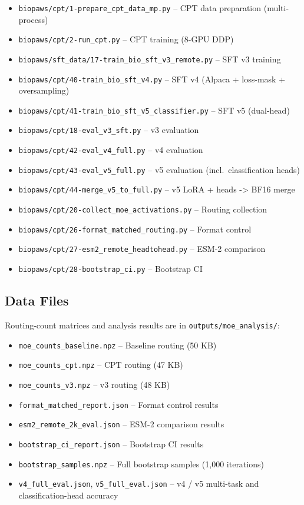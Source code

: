 \documentclass[11pt]{article}
\begin{document}
\begin{itemize}
\item \texttt{biopaws/cpt/1-prepare\_cpt\_data\_mp.py} -- CPT data preparation (multi-process)
\item \texttt{biopaws/cpt/2-run\_cpt.py} -- CPT training (8-GPU DDP)
\item \texttt{biopaws/sft\_data/17-train\_bio\_sft\_v3\_remote.py} -- SFT v3 training
\item \texttt{biopaws/cpt/40-train\_bio\_sft\_v4.py} -- SFT v4 (Alpaca + loss-mask + oversampling)
\item \texttt{biopaws/cpt/41-train\_bio\_sft\_v5\_classifier.py} -- SFT v5 (dual-head)
\item \texttt{biopaws/cpt/18-eval\_v3\_sft.py} -- v3 evaluation
\item \texttt{biopaws/cpt/42-eval\_v4\_full.py} -- v4 evaluation
\item \texttt{biopaws/cpt/43-eval\_v5\_full.py} -- v5 evaluation (incl.\ classification heads)
\item \texttt{biopaws/cpt/44-merge\_v5\_to\_full.py} -- v5 LoRA + heads -> BF16 merge
\item \texttt{biopaws/cpt/20-collect\_moe\_activations.py} -- Routing collection
\item \texttt{biopaws/cpt/26-format\_matched\_routing.py} -- Format control
\item \texttt{biopaws/cpt/27-esm2\_remote\_headtohead.py} -- ESM-2 comparison
\item \texttt{biopaws/cpt/28-bootstrap\_ci.py} -- Bootstrap CI
\end{itemize}

\subsection{Data Files}

Routing-count matrices and analysis results are in \texttt{outputs/moe\_analysis/}:

\begin{itemize}
\item \texttt{moe\_counts\_baseline.npz} -- Baseline routing (50 KB)
\item \texttt{moe\_counts\_cpt.npz} -- CPT routing (47 KB)
\item \texttt{moe\_counts\_v3.npz} -- v3 routing (48 KB)
\item \texttt{format\_matched\_report.json} -- Format control results
\item \texttt{esm2\_remote\_2k\_eval.json} -- ESM-2 comparison results
\item \texttt{bootstrap\_ci\_report.json} -- Bootstrap CI results
\item \texttt{bootstrap\_samples.npz} -- Full bootstrap samples (1,000 iterations)
\item \texttt{v4\_full\_eval.json}, \texttt{v5\_full\_eval.json} -- v4 / v5 multi-task and classification-head accuracy
\end{itemize}
\end{document}
